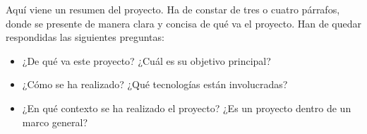 
Aquí viene un resumen del proyecto. Ha de constar de tres o cuatro párrafos,
donde se presente de manera clara y concisa de qué va el proyecto. Han
de quedar respondidas las siguientes preguntas:

\begin{itemize}
  \item ¿De qué va este proyecto? ¿Cuál es su objetivo principal?
  \item ¿Cómo se ha realizado? ¿Qué tecnologías están involucradas?
  \item ¿En qué contexto se ha realizado el proyecto? ¿Es un proyecto
dentro de un marco general?
\end{itemize}
